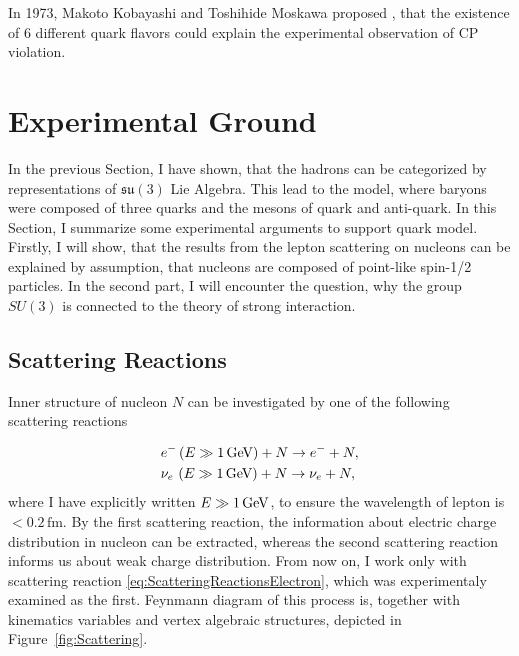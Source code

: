 In 1973, Makoto Kobayashi and Toshihide Moskawa proposed \cite{Quarks6}, that the
existence of 6 different quark flavors could explain the experimental
observation of CP violation.


\section{Experimental Ground}

In the previous Section, I have shown, that the hadrons can be categorized by
representations of $\mathfrak{su}(3)$ Lie Algebra. 
This lead to the model, where baryons were composed of three quarks and the
mesons of quark and anti-quark. 
In this Section, I summarize some experimental arguments to
support quark model.
Firstly, I will show, that the results from the lepton
scattering on nucleons can be explained by assumption, that nucleons are
composed of point-like spin-1/2 particles.
In the second part, I will encounter the question, why the group $SU(3)$ is
connected to the theory of strong interaction. 

\subsection{Scattering Reactions}

Inner structure of nucleon $N$ can be investigated by one of the following
scattering reactions

\begin{align}
  &e^- \, (E \gg 1\,\text{GeV}) + N \rightarrow e^- + N,
  \label{eq:ScatteringReactionsElectron} \\
  &\nu_e \,\, (E \gg 1\,\text{GeV}) + N \rightarrow \nu_e + N,
  \label{eq:ScatteringReactionsNeutrino}
\end{align}
where I have explicitly written $E \gg 1 \,\text{GeV}$, to ensure the wavelength
of lepton is $< 0.2\,\text{fm}$. By the first scattering reaction, the information
about electric charge distribution in nucleon can be extracted, whereas the
second scattering reaction informs us about weak charge distribution. 
From now on, I work only with scattering reaction
\eqref{eq:ScatteringReactionsElectron}, which was experimentaly examined as the
first. 
Feynmann diagram of this process is, together with kinematics variables and
vertex algebraic structures, depicted in Figure~\ref{fig:Scattering}. 

